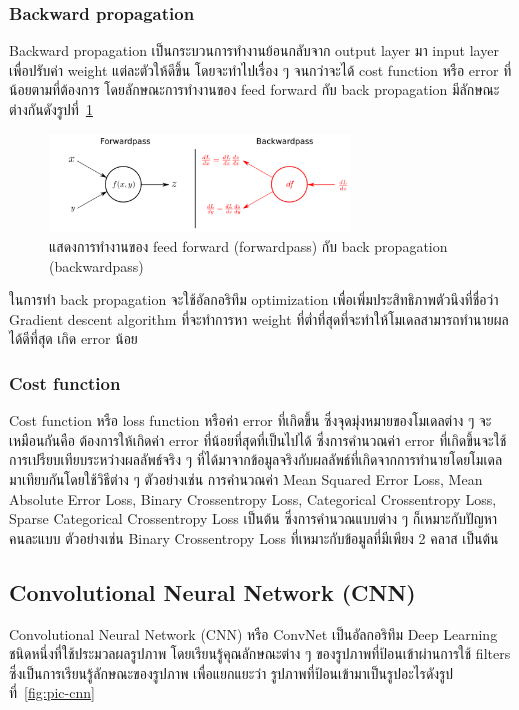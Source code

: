 \documentclass[12pt,oneside,openright,a4paper]{cpe-thai-project}
\begin{document}
\subsubsection{Backward propagation}
\par\setlength{\parindent}{5ex}
Backward propagation เป็นกระบวนการทำงานย้อนกลับจาก output layer มา input layer เพื่อปรับค่า weight แต่ละตัวให้ดีขึ้น โดยจะทำไปเรื่อง ๆ จนกว่าจะได้ cost function หรือ error ที่น้อยตามที่ต้องการ 
โดยลักษณะการทำงานของ feed forward กับ back propagation มีลักษณะต่างกันดังรูปที่~\ref{fig:feed-back}

\begin{figure}[!h]
  \centering
  \includegraphics[width=8cm]{./image/feed_back.png}
  \caption{แสดงการทำงานของ feed forward (forwardpass) กับ back propagation (backwardpass)}
  \label{fig:feed-back}
\end{figure}

\par\setlength{\parindent}{5ex}
ในการทำ back propagation จะใช้อัลกอริทึม optimization เพื่อเพิ่มประสิทธิภาพตัวนึงที่ชื่อว่า Gradient descent algorithm \cite{Gradient17:online} ที่จะทำการหา weight ที่ต่ำที่สุดที่จะทำให้โมเดลสามารถทำนายผลได้ดีที่สุด เกิด error น้อย

\subsubsection{Cost function}
\par\setlength{\parindent}{5ex}
Cost function หรือ loss function หรือค่า error ที่เกิดขึ้น ซึ่งจุดมุ่งหมายของโมเดลต่าง ๆ จะเหมือนกันคือ ต้องการให้เกิดค่า error ที่น้อยที่สุดที่เป็นไปได้ ซึ่งการคำนวณค่า error ที่เกิดขึ้นจะใช้การเปรียบเทียบระหว่างผลลัพธ์จริง ๆ ที่ได้มาจากข้อมูลจริงกับผลลัพธ์ที่เกิดจากการทำนายโดยโมเดลมาเทียบกันโดยใช้วิธีต่าง ๆ ตัวอย่างเช่น การคำนวณค่า Mean Squared Error Loss, Mean Absolute Error Loss, Binary Crossentropy Loss, Categorical Crossentropy Loss, Sparse Categorical Crossentropy Loss เป็นต้น ซึ่งการคำนวณแบบต่าง ๆ ก็เหมาะกับปัญหาคนละแบบ ตัวอย่างเช่น Binary Crossentropy Loss ที่เหมาะกับข้อมูลที่มีเพียง 2 คลาส เป็นต้น

\subsection{Convolutional Neural Network (CNN)}
\par\setlength{\parindent}{5ex}
Convolutional Neural Network (CNN) หรือ ConvNet  \cite{WhatisWe89:online,NeuralTr45:online} เป็นอัลกอริทึม Deep Learning 
ชนิดหนึ่งที่ใช้ประมวลผลรูปภาพ โดยเรียนรู้คุณลักษณะต่าง ๆ ของรูปภาพที่ป้อนเข้าผ่านการใช้ filters 
ซึ่งเป็นการเรียนรู้ลักษณะของรูปภาพ เพื่อแยกแยะว่า รูปภาพที่ป้อนเข้ามาเป็นรูปอะไรดังรูปที่~\ref{fig:pic-cnn}
\end{document}
